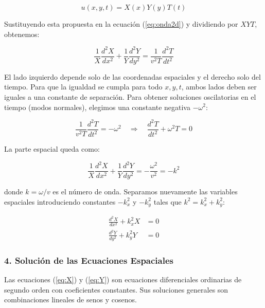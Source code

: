 \documentclass[a4paper]{article}
\begin{document}
\begin{equation}
u(x, y, t) = X(x) Y(y) T(t)
\end{equation}

Sustituyendo esta propuesta en la ecuación (\ref{eq:onda2d}) y dividiendo por $X Y T$, obtenemos:

\begin{equation}
\frac{1}{X} \frac{d^2 X}{d x^2} + \frac{1}{Y} \frac{d^2 Y}{d y^2} = \frac{1}{v^2 T} \frac{d^2 T}{d t^2}
\end{equation}

El lado izquierdo depende solo de las coordenadas espaciales y el derecho solo del tiempo. Para que la igualdad se cumpla para todo $x, y, t$, ambos lados deben ser iguales a una constante de separación. Para obtener soluciones oscilatorias en el tiempo (modos normales), elegimos una constante negativa $-\omega^2$:

\begin{equation}
\frac{1}{v^2 T} \frac{d^2 T}{d t^2} = -\omega^2 \quad \Rightarrow \quad \frac{d^2 T}{d t^2} + \omega^2 T = 0
\end{equation}

La parte espacial queda como:

\begin{equation}
\frac{1}{X} \frac{d^2 X}{d x^2} + \frac{1}{Y} \frac{d^2 Y}{d y^2} = -\frac{\omega^2}{v^2} = -k^2
\end{equation}

donde $k = \omega/v$ es el número de onda. Separamos nuevamente las variables espaciales introduciendo constantes $-k_x^2$ y $-k_y^2$ tales que $k^2 = k_x^2 + k_y^2$:

\begin{align}
\frac{d^2 X}{d x^2} + k_x^2 X &= 0 \label{eq:X} \\
\frac{d^2 Y}{d y^2} + k_y^2 Y &= 0 \label{eq:Y}
\end{align}

\subsubsection{4. Solución de las Ecuaciones Espaciales}

Las ecuaciones (\ref{eq:X}) y (\ref{eq:Y}) son ecuaciones diferenciales ordinarias de segundo orden con coeficientes constantes. Sus soluciones generales son combinaciones lineales de senos y cosenos.
\end{document}
